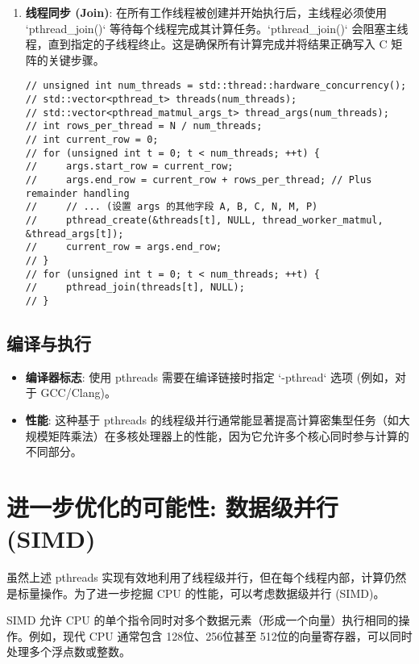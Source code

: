\documentclass{article}
\begin{document}
\begin{enumerate}
    \item \textbf{线程同步 (Join)}: 在所有工作线程被创建并开始执行后，主线程必须使用 `pthread_join()` 等待每个线程完成其计算任务。`pthread_join()` 会阻塞主线程，直到指定的子线程终止。这是确保所有计算完成并将结果正确写入 C 矩阵的关键步骤。
    \begin{lstlisting}[caption={主线程中创建与等待 pthreads (概念)}]
// unsigned int num_threads = std::thread::hardware_concurrency();
// std::vector<pthread_t> threads(num_threads);
// std::vector<pthread_matmul_args_t> thread_args(num_threads);
// int rows_per_thread = N / num_threads;
// int current_row = 0;
// for (unsigned int t = 0; t < num_threads; ++t) {
//     args.start_row = current_row;
//     args.end_row = current_row + rows_per_thread; // Plus remainder handling
//     // ... (设置 args 的其他字段 A, B, C, N, M, P)
//     pthread_create(&threads[t], NULL, thread_worker_matmul, &thread_args[t]);
//     current_row = args.end_row;
// }
// for (unsigned int t = 0; t < num_threads; ++t) {
//     pthread_join(threads[t], NULL);
// }
    \end{lstlisting}
\end{enumerate}

\subsection{编译与执行}
\begin{itemize}
    \item \textbf{编译器标志}: 使用 pthreads 需要在编译链接时指定 `-pthread` 选项 (例如，对于 GCC/Clang)。
    \item \textbf{性能}: 这种基于 pthreads 的线程级并行通常能显著提高计算密集型任务（如大规模矩阵乘法）在多核处理器上的性能，因为它允许多个核心同时参与计算的不同部分。
\end{itemize}

\section{进一步优化的可能性: 数据级并行 (SIMD)}
虽然上述 pthreads 实现有效地利用了线程级并行，但在每个线程内部，计算仍然是标量操作。为了进一步挖掘 CPU 的性能，可以考虑数据级并行 (SIMD)。

SIMD 允许 CPU 的单个指令同时对多个数据元素（形成一个向量）执行相同的操作。例如，现代 CPU 通常包含 128位、256位甚至 512位的向量寄存器，可以同时处理多个浮点数或整数。
\end{document}

